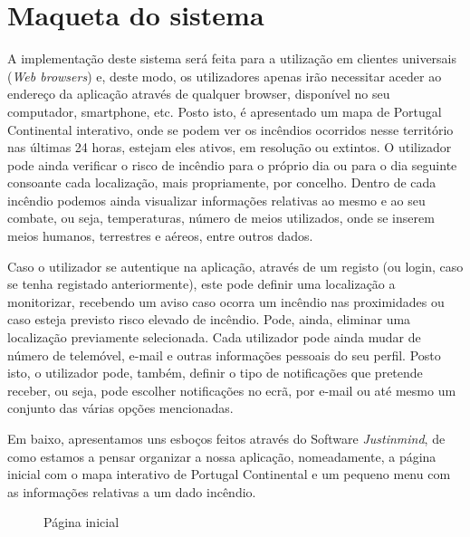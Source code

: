 \documentclass[a4paper,12pt]{scrreprt}
\newcommand{\tab}{
    \hspace{1cm}}
\begin{document}
    \section{Maqueta do sistema}
        \tab A implementação deste sistema será feita para a utilização em clientes universais (\textit{Web browsers}) e, deste modo, os utilizadores apenas irão necessitar aceder ao endereço da aplicação através de qualquer browser, disponível no seu computador, smartphone, etc. Posto isto, é apresentado um mapa de Portugal Continental interativo, onde se podem ver os incêndios ocorridos nesse território nas últimas 24 horas, estejam eles ativos, em resolução ou extintos. O utilizador pode ainda verificar o risco de incêndio para o próprio dia ou para o dia seguinte consoante cada localização, mais propriamente, por concelho. Dentro de cada incêndio podemos ainda visualizar informações relativas ao mesmo e ao seu combate, ou seja, temperaturas, número de meios utilizados, onde se inserem meios humanos, terrestres e aéreos, entre outros dados.
   
        \tab Caso o utilizador se autentique na aplicação, através de um registo (ou login, caso se tenha registado anteriormente), este pode definir uma localização a monitorizar, recebendo um aviso caso ocorra um incêndio nas proximidades ou caso esteja previsto risco elevado de incêndio. Pode, ainda, eliminar uma localização previamente selecionada. Cada utilizador pode ainda mudar de número de telemóvel, e-mail e outras informações pessoais do seu perfil. Posto isto, o utilizador pode, também, definir o tipo de notificações que pretende receber, ou seja, pode escolher notificações no ecrã, por e-mail ou até mesmo um conjunto das várias opções mencionadas.
        
        \tab Em baixo, apresentamos uns esboços feitos através do Software \textit{Justinmind}, de como estamos a pensar organizar a nossa aplicação, nomeadamente, a página inicial com o mapa interativo de Portugal Continental e um pequeno menu com as informações relativas a um dado incêndio.
        
        \vspace{0.6cm}
        
        \begin{figure}[hbt!]
            \centering
            \caption{Página inicial}
        \end{figure}
        
\end{document}
